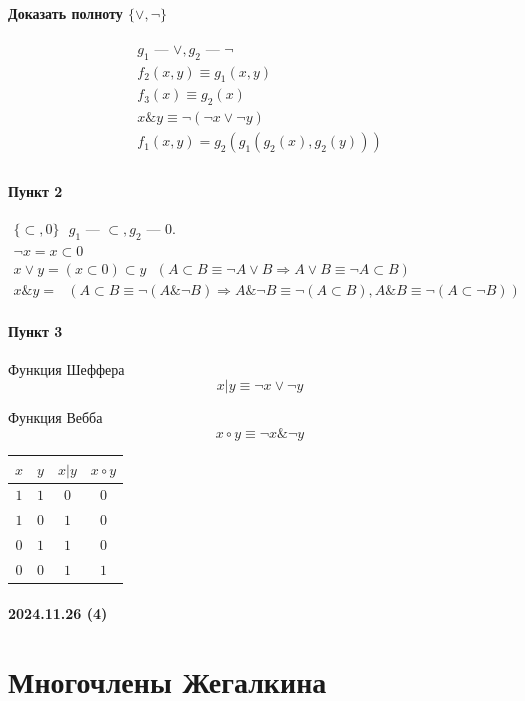 \documentclass{article}
\begin{document}
\paragraph{Доказать полноту $\{\vee, \neg\}$}
\begin{gather*}
    g_1 \text{ --- } \vee, g_2 \text{ --- } \neg \\
    f_2(x, y) \equiv g_1(x, y) \\
    f_3(x) \equiv g_2(x) \\
    x \& y \equiv \neg(\neg x \vee \neg y) \\
    f_1(x, y) = g_2(g_1(g_2(x), g_2(y))) \\
\end{gather*}
\paragraph{Пункт 2}
\begin{gather*}
    \{\subset, 0\} ~~~ g_1 \text{ --- } \subset, g_2 \text{ --- } 0. \\
    \neg x = x \subset 0 \\
    x \vee y = (x \subset 0) \subset y ~~~ (A \subset B \equiv \neg A \vee B \Rightarrow A \vee B \equiv \neg A \subset B) \\
    x \& y = ~~~ (A \subset B \equiv \neg(A \& \neg B) \Rightarrow A \& \neg B \equiv \neg(A \subset B), A \& B \equiv \neg(A \subset \neg B))
\end{gather*}
\paragraph{Пункт 3}
Функция Шеффера
\[
    x \big| y \equiv \neg x \vee \neg y
\]

Функция Вебба
\[
    x \circ y \equiv \neg x \& \neg y
\]

\begin{tabular}{c|c|c|c}
    $x$ & $y$ & $x \big| y$ & $x \circ y$ \\
    \hline
    $1$ & $1$ & $0$ & $0$ \\
    $1$ & $0$ & $1$ & $0$ \\
    $0$ & $1$ & $1$ & $0$ \\
    $0$ & $0$ & $1$ & $1$ 
\end{tabular}


\paragraph{2024.11.26 (4)}
\section{Многочлены Жегалкина}
\end{document}
